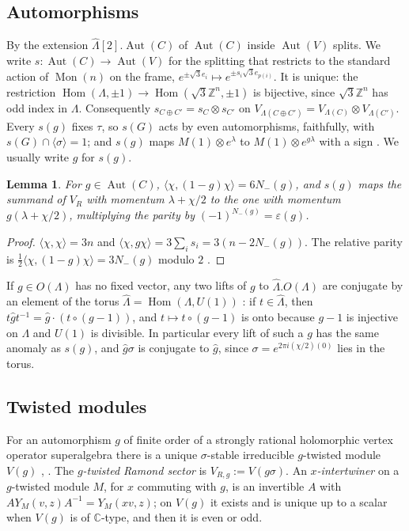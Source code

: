 \documentclass[11pt]{amsart}
\newtheorem{lemma}[theorem]{Lemma}
\theoremstyle{definition}
\newcommand{\Z}{\mathbb{Z}}
\newcommand{\C}{\mathbb{C}}
\newcommand{\Aut}{\operatorname{Aut}}
\newcommand{\Mon}{\operatorname{Mon}}
\begin{document}
\subsection{Automorphisms}
By \cite[Thm.~3.1]{GJF} the extension $\widehat\Lambda[2].\Aut(C)$ of $\Aut(C)$ inside $\Aut(V)$
splits. We write $s\colon\Aut(C)\to\Aut(V)$ for the splitting that restricts to the standard action of
$\Mon(n)$ on the frame, $e^{\pm\sqrt3e_i}\mapsto e^{\pm s_i\sqrt3e_{p(i)}}$. It is unique: the restriction
$\operatorname{Hom}(\Lambda,\pm1)\to\operatorname{Hom}(\sqrt3\Z^n,\pm1)$ is bijective, since
$\sqrt3\Z^n$ has odd index in $\Lambda$. Consequently $s_{C\oplus C'}=s_C\otimes s_{C'}$ on
$V_{\Lambda(C\oplus C')}=V_{\Lambda(C)}\otimes V_{\Lambda(C')}$. Every $s(g)$ fixes $\tau$, so $s(G)$
acts by even automorphisms, faithfully, with $s(G)\cap\langle\sigma\rangle=1$; and $s(g)$ maps
$M(1)\otimes e^\lambda$ to $M(1)\otimes e^{g\lambda}$ with a sign \cite[Prop.~4.1]{BK}. We usually write
$g$ for $s(g)$.

\begin{lemma}\label{lem:majnumber}
For $g\in\Aut(C)$, $\langle\chi,(1-g)\chi\rangle=6N_-(g)$, and $s(g)$ maps the summand of $V_R$ with
momentum $\lambda+\chi/2$ to the one with momentum $g(\lambda+\chi/2)$, multiplying the parity by
$(-1)^{N_-(g)}=\varepsilon(g)$.
\end{lemma}

\begin{proof}
$\langle\chi,\chi\rangle=3n$ and $\langle\chi,g\chi\rangle=3\sum_is_i=3(n-2N_-(g))$. The relative parity
is $\tfrac12\langle\chi,(1-g)\chi\rangle=3N_-(g)$ modulo $2$ \cite[Ex.~4.4]{GJF}.
\end{proof}

If $g\in O(\Lambda)$ has no fixed vector, any two lifts of $g$ to $\widehat\Lambda.O(\Lambda)$ are
conjugate by an element of the torus $\widehat\Lambda=\operatorname{Hom}(\Lambda,U(1))$
\cite[Ex.~4.4]{GJF}: if $t\in\widehat\Lambda$, then $t\hat gt^{-1}=\hat g\cdot(t\circ(g-1))$, and
$t\mapsto t\circ(g-1)$ is onto because $g-1$ is injective on $\Lambda$ and $U(1)$ is divisible. In
particular every lift of such a $g$ has the same anomaly as $s(g)$, and $\hat g\sigma$ is conjugate to
$\hat g$, since $\sigma=e^{2\pi i(\chi/2)(0)}$ lies in the torus.

\subsection{Twisted modules}\label{sec:twisted}
For an automorphism $g$ of finite order of a strongly rational holomorphic vertex operator
superalgebra there is a unique $\sigma$-stable irreducible $g$-twisted module $V(g)$
\cite[Thm.~7.7]{DZ}, \cite[Prop.~3.4]{DRY}. The \emph{$g$-twisted Ramond sector} is $V_{R,g}:=V(g\sigma)$.
An \emph{$x$-intertwiner} on a $g$-twisted module $M$, for $x$ commuting with $g$, is an invertible $A$
with $AY_M(v,z)A^{-1}=Y_M(xv,z)$; on $V(g)$ it exists and is unique up to a scalar when $V(g)$ is of
$\C$-type, and then it is even or odd.
\end{document}
